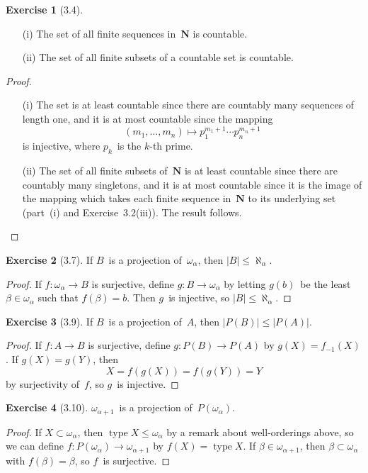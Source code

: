 \documentclass[letterpaper,12pt]{article}
\newcommand{\N}{\boldsymbol{N}}
\renewcommand{\P}{P}
\newcommand{\al}{\aleph}
\DeclareMathOperator{\type}{type}
\newcommand{\preimage}[1]{#1_{-1}}
\newcommand{\card}[1]{|#1|}
\theoremstyle{definition}
\newtheorem*{exer}{Exercise}
\theoremstyle{remark}
\begin{document}
\begin{exer}[3.4]\
\begin{enumerate}[itemsep=0pt]
\item[(i)] The set of all finite sequences in~\(\N\) is countable.
\item[(ii)] The set of all finite subsets of a countable set is countable.
\end{enumerate}
\end{exer}
\begin{proof}\
\begin{enumerate}[itemsep=0pt]
\item[(i)] The set is at least countable since there are countably many sequences of length one, and it is at most countable since the mapping
\[(m_1,\ldots,m_n)\mapsto p_1^{m_1+1}\cdots p_n^{m_n+1}\]
is injective, where \(p_k\)~is the \(k\)-th prime.
\item[(ii)] The set of all finite subsets of~\(\N\) is at least countable since there are countably many singletons, and it is at most countable since it is the image of the mapping which takes each finite sequence in~\(\N\) to its underlying set (part~(i) and Exercise~3.2(iii)). The result follows.\qedhere
\end{enumerate}
\end{proof}

\begin{exer}[3.7]
If \(B\)~is a projection of~\(\omega_{\alpha}\), then \(\card{B}\le\al_{\alpha}\).
\end{exer}
\begin{proof}
If \(f:\omega_{\alpha}\to B\) is surjective, define \(g:B\to\omega_{\alpha}\) by letting \(g(b)\)~be the least \(\beta\in\omega_{\alpha}\) such that \(f(\beta)=b\). Then \(g\)~is injective, so \(\card{B}\le\al_{\alpha}\).
\end{proof}

\begin{exer}[3.9]
If \(B\)~is a projection of~\(A\), then \(\card{\P(B)}\le\card{\P(A)}\).
\end{exer}
\begin{proof}
If \(f:A\to B\) is surjective, define \(g:\P(B)\to\P(A)\) by \(g(X)=\preimage{f}(X)\). If \(g(X)=g(Y)\), then
\[X=f(g(X))=f(g(Y))=Y\]
by surjectivity of~\(f\), so \(g\)~is injective.
\end{proof}

\begin{exer}[3.10]
\(\omega_{\alpha+1}\)~is a projection of~\(\P(\omega_{\alpha})\).
\end{exer}
\begin{proof}
If \(X\subset\omega_{\alpha}\), then \(\type X\le\omega_{\alpha}\) by a remark about well-orderings above, so we can define \(f:\P(\omega_{\alpha})\to\omega_{\alpha+1}\) by \(f(X)=\type X\). If \(\beta\in\omega_{\alpha+1}\), then \(\beta\subset\omega_{\alpha}\) with \(f(\beta)=\beta\), so \(f\)~is surjective.
\end{proof}
\end{document}
